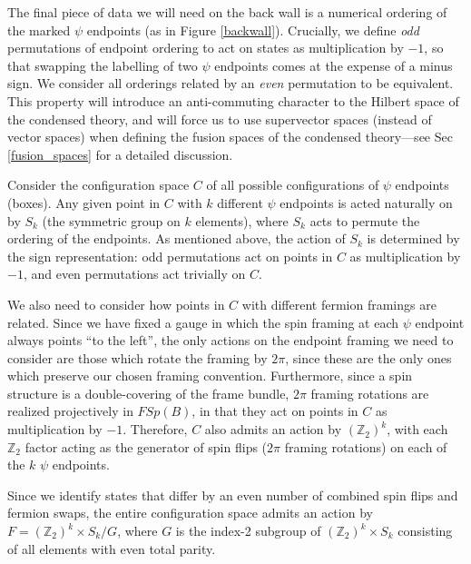 \documentclass[12pt,a4paper]{article}
\newcommand{\zt}{\mathbb{Z}_2}
\begin{document}
The final piece of data we will need on the back wall is a numerical ordering of the marked $\psi$ endpoints (as in Figure \ref{backwall}). Crucially, we define {\it odd} permutations of endpoint ordering to act on states as multiplication by $-1$, so that swapping the labelling of two $\psi$ endpoints comes at the expense of a minus sign. 
We consider all orderings related by an {\it even} permutation to be equivalent. 
This property will introduce an anti-commuting character to the Hilbert space of the condensed theory, and will force us to use supervector spaces (instead of vector spaces) when defining the fusion spaces of the condensed theory---see Sec \ref{fusion_spaces} for a detailed discussion. 

Consider the configuration space $C$ of all possible configurations of $\psi$ endpoints (boxes). Any given point in $C$ with $k$ different $\psi$ endpoints is acted naturally on by $S_k$ (the symmetric group on $k$ elements), where $S_k$ acts to permute the ordering of the endpoints.
As mentioned above, the action of $S_k$ is determined by the sign representation: odd permutations act on points in $C$ as multiplication by $-1$, and even permutations act trivially on $C$.

We also need to consider how points in $C$ with different fermion framings are related. 
Since we have fixed a gauge in which the spin framing at each $\psi$ endpoint always points ``to the left'', the only actions on the endpoint framing we need to consider are those which rotate the framing by $2\pi$, since these are the only ones which preserve our chosen framing convention. 
Furthermore, since a spin structure is a double-covering of the frame bundle, $2\pi$ framing rotations are realized projectively in $FSp(B)$, in that they act on points in $C$ as multiplication by $-1$. 
Therefore, $C$ also admits an action by $(\zt)^k$, with each $\zt$ factor acting as the generator of spin flips ($2\pi$ framing rotations) on each of the $k$ $\psi$ endpoints.

Since we identify states that differ by an even number of combined spin flips and fermion swaps, the entire configuration space admits an action by $F = (\zt)^k\times S_k / G$, 
where $G$ is the index-2 subgroup of $(\zt)^k\times S_k$ consisting of all elements with even total parity.
\end{document}
